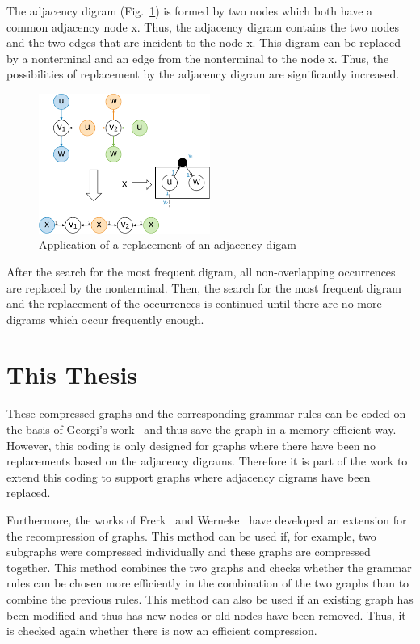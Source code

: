 \documentclass[a4paper]{scrartcl}
\begin{document}
The adjacency digram (Fig.~\ref{fig:adjazenzDigram}) is formed by two nodes which both have a common adjacency node x. Thus, the adjacency digram contains the two nodes and the two edges that are incident to the node x. This digram can be replaced by a nonterminal and an edge from the nonterminal to the node x.
Thus, the possibilities of replacement by the adjacency digram are significantly increased.


\begin{figure}[h]
	\centering
	\includegraphics[width=0.5\textwidth]{img/adjazenzDigram}
	\caption{Application of a replacement of an adjacency digam}
	\label{fig:adjazenzDigram}
\end{figure}

After the search for the most frequent digram, all non-overlapping occurrences are replaced by the nonterminal. Then, the search for the most frequent digram and the replacement of the occurrences is continued until there are no more digrams which occur frequently enough.



\section{This Thesis}

These compressed graphs and the corresponding grammar rules can be coded on the basis of Georgi's work~\cite{georgi} and thus save the graph in a memory efficient way. However, this coding is only designed for graphs where there have been no replacements based on the adjacency digrams. Therefore it is part of the work to extend this coding to support graphs where adjacency digrams have been replaced.

Furthermore, the works of Frerk~\cite{pfrerk} and Werneke~\cite{werneke} have developed an extension for the recompression of graphs. This method can be used if, for example, two subgraphs were compressed individually and these graphs are compressed together. This method combines the two graphs and checks whether the grammar rules can be chosen more efficiently in the combination of the two graphs than to combine the previous rules. This method can also be used if an existing graph has been modified and thus has new nodes or old nodes have been removed. Thus, it is checked again whether there is now an efficient compression.
\end{document}
